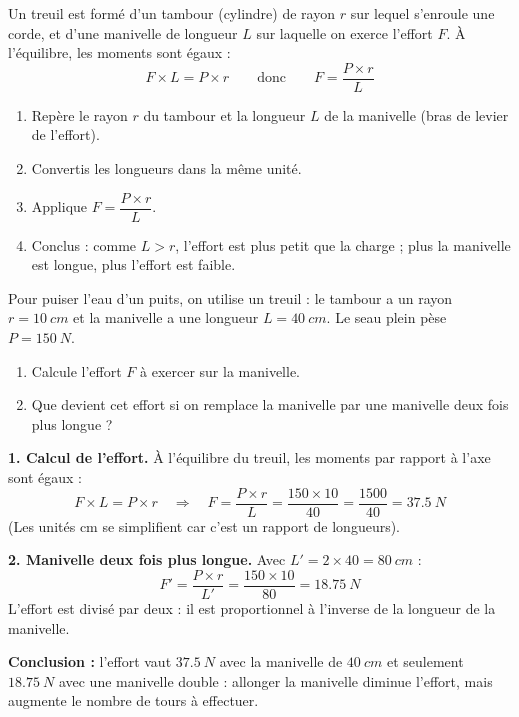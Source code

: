 \documentclass[11pt]{article}
\newcounter{popsec}
\newcounter{popsub}
\newcommand{\courssub}[1]{%
  \stepcounter{popsub}%
  \par\vspace{9pt}\noindent{\popxbold\fontsize{11.5}{13}\selectfont\color{popink}{\color{poporange}\thepopsec.\thepopsub}\hspace{6pt}#1}\par\nopagebreak\vspace{4pt}
}
\begin{document}
\courssub{Méthode 5 : Étudier un treuil}

\begin{methode}
Un treuil est formé d'un tambour (cylindre) de rayon $r$ sur lequel s'enroule une corde, et d'une manivelle de longueur $L$ sur laquelle on exerce l'effort $F$. À l'équilibre, les moments sont égaux :
\[ F \times L = P \times r \qquad \text{donc} \qquad F = \frac{P \times r}{L} \]
\begin{enumerate}
\item Repère le rayon $r$ du tambour et la longueur $L$ de la manivelle (bras de levier de l'effort).
\item Convertis les longueurs dans la même unité.
\item Applique $F = \dfrac{P \times r}{L}$.
\item Conclus : comme $L > r$, l'effort est plus petit que la charge ; plus la manivelle est longue, plus l'effort est faible.
\end{enumerate}
\end{methode}

\begin{exoresolu}
Pour puiser l'eau d'un puits, on utilise un treuil : le tambour a un rayon $r = \SI{10}{cm}$ et la manivelle a une longueur $L = \SI{40}{cm}$. Le seau plein pèse $P = \SI{150}{N}$.
\begin{enumerate}
\item Calcule l'effort $F$ à exercer sur la manivelle.
\item Que devient cet effort si on remplace la manivelle par une manivelle deux fois plus longue ?
\end{enumerate}
\tcblower
\textbf{1. Calcul de l'effort.} À l'équilibre du treuil, les moments par rapport à l'axe sont égaux :
\[ F \times L = P \times r \quad \Longrightarrow \quad F = \frac{P \times r}{L} = \frac{150 \times 10}{40} = \frac{1500}{40} = \SI{37,5}{N} \]
(Les unités cm se simplifient car c'est un rapport de longueurs).

\textbf{2. Manivelle deux fois plus longue.} Avec $L' = 2 \times 40 = \SI{80}{cm}$ :
\[ F' = \frac{P \times r}{L'} = \frac{150 \times 10}{80} = \SI{18,75}{N} \]
L'effort est divisé par deux : il est proportionnel à l'inverse de la longueur de la manivelle.

\textbf{Conclusion :} l'effort vaut $\SI{37,5}{N}$ avec la manivelle de $\SI{40}{cm}$ et seulement $\SI{18,75}{N}$ avec une manivelle double : allonger la manivelle diminue l'effort, mais augmente le nombre de tours à effectuer.
\end{exoresolu}
\end{document}
